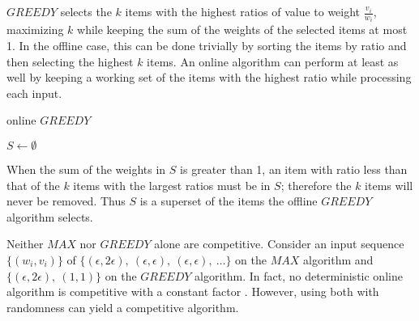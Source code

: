 $GREEDY$ selects the $k$ items with the highest ratios of value to weight $\frac{v_i}{w_i}$, maximizing $k$ while keeping the sum of the weights of the selected items at most 1. In the offline case, this can be done trivially by sorting the items by ratio and then selecting the highest $k$ items. An online algorithm can perform at least as well by keeping a working set of the items with the highest ratio while processing each input.

\begin{algorithm}
	\caption{online $GREEDY$}
	$S \leftarrow \emptyset$\;
\end{algorithm}

When the sum of the weights in $S$ is greater than 1, an item with ratio less than that of the $k$ items with the largest ratios must be in $S$; therefore the $k$ items will never be removed. Thus $S$ is a superset of the items the offline $GREEDY$ algorithm selects.

Neither $MAX$ nor $GREEDY$ alone are competitive. Consider an input sequence $\{(w_i,v_i)\}$ of $\{(\epsilon,2\epsilon),\ (\epsilon,\epsilon),\ (\epsilon,\epsilon),\ \ldots\}$ on the $MAX$ algorithm and $\{(\epsilon, 2\epsilon),\ (1,1)\}$ on the $GREEDY$ algorithm. In fact, no deterministic online algorithm is competitive with a constant factor \cite{iwama}. However, using both with randomness can yield a competitive algorithm.

